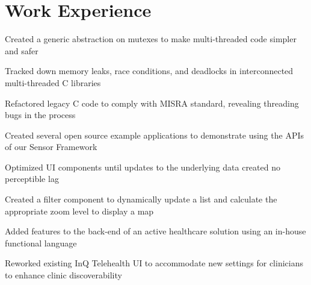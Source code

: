 \section{Work Experience}

\begin{bullets}
	\item Created a generic abstraction on mutexes to make multi-threaded code simpler and safer
    \item Tracked down memory leaks, race conditions, and deadlocks in interconnected multi-threaded C libraries
    \item Refactored legacy C code to comply with MISRA standard, revealing threading bugs in the process
    \item Created several open source example applications to demonstrate using the APIs of our Sensor Framework
\end{bullets}

\hbox{}

\begin{bullets}
    \item Optimized UI components until updates to the underlying data created no perceptible lag
    \item Created a filter component to dynamically update a list and calculate the appropriate zoom level to display a map
    \item Added features to the back-end of an active healthcare solution using an in-house functional language
    \item Reworked existing InQ Telehealth UI to accommodate new settings for clinicians to enhance clinic discoverability
\end{bullets}

\hbox{}

